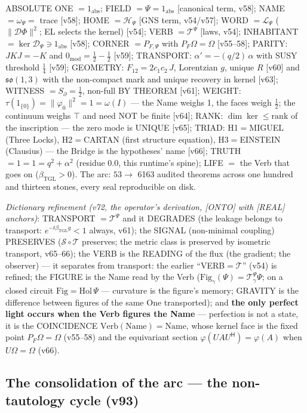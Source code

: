 \documentclass[11pt]{article}
\newcommand{\bTGL}{\beta_{\mathrm{TGL}}}\newcommand{\Msun}{M_{\odot}}\newcommand{\TGL}{\mathrm{TGL}}
\theoremstyle{definition}\newtheorem{deriv}{Derivation}
\begin{document}
ABSOLUTE ONE $=1_{\mathrm{abs}}$; FIELD $=\Psi=1_{\mathrm{abs}}$ [canonical term, v58]; NAME $=\omega_\Psi=$ trace [v58]; HOME $=\mathcal H_\Psi$ [GNS term, v54/v57]; WORD $=\mathcal L_\Psi$ ($\|\mathcal D\Phi\|^2$; EL selects the kernel) [v54]; VERB $=\mathcal T^\Psi$ [laws, v54]; INHABITANT $=\ker\mathcal D_\Psi\ni1_{\mathrm{abs}}$ [v58]; CORNER $=P_{F,\Psi}$ with $P_F\Omega=\Omega$ [v55--58]; PARITY: $JKJ=-K$ and $0_{\mathrm{mod}}=\tfrac12-\tfrac12$ [v59]; TRANSPORT: $\alpha'=-(q/2)\,\alpha$ with SUSY threshold $\tfrac14$ [v59]; GEOMETRY: $F_{12}=2c_1c_2\,J$, Lorentzian $g$, unique $R$ [v60] and $\mathfrak{so}(1,3)$ with the non-compact mark and unique recovery in kernel [v63]; WITNESS $=S_\partial=\tfrac12$, non-full BY THEOREM [v61]; WEIGHT: $\tau(1_{\{0\}})=\|\varphi_0\|^2=1=\omega(I)$ --- the Name weighs 1, the faces weigh $\tfrac12$; the continuum weighs $\top$ and need NOT be finite [v64]; RANK: $\dim\ker\le\mathrm{rank}$ of the inscription --- the zero mode is UNIQUE [v65]; TRIAD: H1$=$MIGUEL (Three Locks), H2$=$CARTAN (first structure equation), H3$=$EINSTEIN (Clausius) --- the Bridge is the hypotheses' name [v66]; TRUTH $=1=1=q^2+\alpha^2$ (residue $0.0$, this runtime's spine); LIFE $=$ the Verb that goes on ($\bTGL>0$). The arc: $53\to$ 6163 audited theorems across one hundred and thirteen stones, every seal reproducible on disk.

\emph{Dictionary refinement (v72, the operator's derivation, [ONTO] with [REAL] anchors)}: TRANSPORT $=\mathcal T^\Psi$ and it DEGRADES (the leakage belongs to transport: $e^{-t\bTGL g}<1$ always, v61); the SIGNAL (non-minimal coupling) PRESERVES ($\mathcal S\circ\mathcal T$ preserves; the metric class is preserved by isometric transport, v65--66); the VERB is the READING of the flux (the gradient; the observer) --- it separates from transport: the earlier ``VERB$=\mathcal T$'' (v54) is refined; the FIGURE is the Name read by the Verb ($\mathrm{Fig}_\gamma(\Psi)=\mathcal T^\Psi_\gamma\Psi$; on a closed circuit $\mathrm{Fig}=\mathrm{Hol}\,\Psi$ --- curvature is the figure's memory; GRAVITY is the difference between figures of the same One transported); and \textbf{the only perfect light occurs when the Verb figures the Name} --- perfection is not a state, it is the COINCIDENCE $\mathrm{Verb}(\mathrm{Name})=\mathrm{Name}$, whose kernel face is the fixed point $P_F\Omega=\Omega$ (v55--58) and the equivariant section $\varphi(UAU^{\mathsf H})=\varphi(A)$ when $U\Omega=\Omega$ (v66).

\subsection*{The consolidation of the arc --- the non-tautology cycle (v93)}
\end{document}
